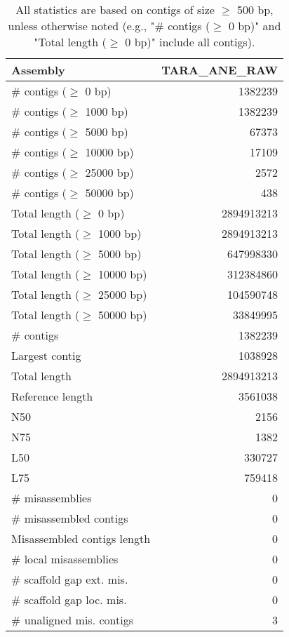 \documentclass[12pt,a4paper]{article}
\begin{document}
\begin{table}[ht]
\begin{center}
\caption{All statistics are based on contigs of size $\geq$ 500 bp, unless otherwise noted (e.g., "\# contigs ($\geq$ 0 bp)" and "Total length ($\geq$ 0 bp)" include all contigs).}
\begin{tabular}{|l*{1}{|r}|}
\hline
Assembly & TARA\_ANE\_RAW \\ \hline
\# contigs ($\geq$ 0 bp) & 1382239 \\ \hline
\# contigs ($\geq$ 1000 bp) & 1382239 \\ \hline
\# contigs ($\geq$ 5000 bp) & 67373 \\ \hline
\# contigs ($\geq$ 10000 bp) & 17109 \\ \hline
\# contigs ($\geq$ 25000 bp) & 2572 \\ \hline
\# contigs ($\geq$ 50000 bp) & 438 \\ \hline
Total length ($\geq$ 0 bp) & 2894913213 \\ \hline
Total length ($\geq$ 1000 bp) & 2894913213 \\ \hline
Total length ($\geq$ 5000 bp) & 647998330 \\ \hline
Total length ($\geq$ 10000 bp) & 312384860 \\ \hline
Total length ($\geq$ 25000 bp) & 104590748 \\ \hline
Total length ($\geq$ 50000 bp) & 33849995 \\ \hline
\# contigs & 1382239 \\ \hline
Largest contig & 1038928 \\ \hline
Total length & 2894913213 \\ \hline
Reference length & 3561038 \\ \hline
N50 & 2156 \\ \hline
N75 & 1382 \\ \hline
L50 & 330727 \\ \hline
L75 & 759418 \\ \hline
\# misassemblies & 0 \\ \hline
\# misassembled contigs & 0 \\ \hline
Misassembled contigs length & 0 \\ \hline
\# local misassemblies & 0 \\ \hline
\# scaffold gap ext. mis. & 0 \\ \hline
\# scaffold gap loc. mis. & 0 \\ \hline
\# unaligned mis. contigs & 3 \\ \hline

\end{tabular}
\end{center}
\end{table}
\end{document}
